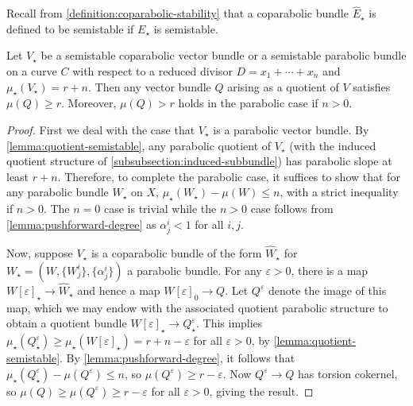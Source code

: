 Recall from
\autoref{definition:coparabolic-stability} that a coparabolic bundle $\widehat{E}_\star$ is defined to be
semistable if $E_\star$ is semistable.
\begin{lemma}
\notready
	\label{lemma:quotient-slope}
	Let $V_\star$ be a semistable coparabolic vector
	bundle or a semistable parabolic bundle on a curve $C$ with respect to a
	reduced divisor $D=x_1+\cdots +x_n$ and $\mu_\star(V_\star)=r+n$.
	Then any vector bundle $Q$ arising as a quotient of $V$ satisfies
	$\mu(Q)\geq r$.
	Moreover, $\mu(Q) > r$ holds in the parabolic case if $n > 0$.
\end{lemma}
\begin{proof}
	First we deal with the case that $V_\star$ is a parabolic vector bundle.
	By \autoref{lemma:quotient-semistable}, any
	parabolic quotient of $V_\star$
	(with the induced quotient structure of
	\autoref{subsubsection:induced-subbundle})
	has parabolic slope at least $r+n$.
	Therefore, to complete the parabolic case,
	it suffices to show that for any parabolic bundle $W_\star$ on $X$,
	$\mu_\star(W_\star) - \mu(W) \leq n$, with a strict inequality if $n >
	0$.
	The $n = 0$ case is trivial while the $n > 0$ case
	follows from \autoref{lemma:pushforward-degree} as $\alpha^i_j < 1$ for
	all $i, j$.

	Now, suppose $V_\star$ is a coparabolic bundle of the form $\widehat{W}_\star$ for $W_\star =
	(W, \{W^i_j\}, \{\alpha^i_j\})$ a parabolic bundle.
	For any $\varepsilon > 0$, there is a map $W[\varepsilon]_\star \to
	\widehat{W}_\star$ and hence a map $W[\varepsilon]_0 \to Q$.
	Let $Q^\varepsilon$ denote the image of this map, which we may endow
	with the associated quotient parabolic structure to obtain a quotient
	bundle
	$W[\varepsilon]_\star \to Q^\varepsilon_\star$.
	This implies
	$\mu_\star(Q^\varepsilon_\star) \geq \mu_\star(W[\varepsilon]_\star) = r + n - \varepsilon$
	for all $\varepsilon > 0$, by \autoref{lemma:quotient-semistable}.
	By \autoref{lemma:pushforward-degree}, it follows that
        $\mu_\star(Q^\varepsilon_\star) - \mu(Q^\varepsilon) \leq n$, so
	$\mu(Q^\varepsilon) \geq r-\varepsilon$. Now $Q^\varepsilon\to Q$ has
	torsion cokernel, so $\mu(Q)\geq \mu(Q^\varepsilon)\geq r-\varepsilon$
	for all $\varepsilon>0$, giving the result.
\end{proof}

